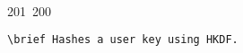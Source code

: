 201~200~\documentclass{article}
\begin{document}
\begin{lstlisting}[language=Python, caption=Key Derivation with HKDF]
	                                                                                                                                                                                                                                                                                                	                                                                                                                                        	    	                                                                                                	                                                                                                                                                                                                                                                                                                                \brief Hashes a user key using HKDF.
	                                                                                                                                                                                                                                                                                                	                                                                                                                                        	    	                                                                                                	                                                                                                                                                                                                                                                                                                                    \param userkey The user key to hash.
	                                                                                                                                                                                                                                                                                                	                                                                                                                                        	    	                                                                                                	                                                                                                                                                                                                                                                                                                                        \return The hashed user key.

\end{lstlisting}
\end{document}
